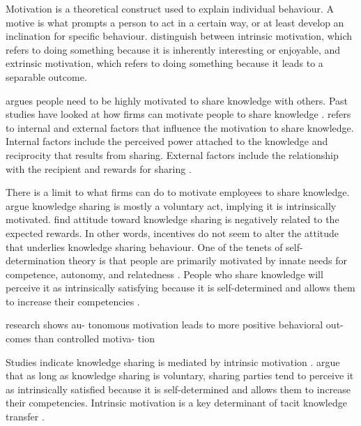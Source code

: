 Motivation is a theoretical construct used to explain individual behaviour. A motive is what prompts a person to act in a certain way, or at least develop an inclination for specific behaviour. \citet{deci1985general} distinguish between intrinsic motivation, which refers to doing something because it is inherently interesting or enjoyable, and extrinsic motivation, which refers to doing something because it leads to a separable outcome. 

\citet{davenport1997ten} argues people need to be highly motivated to share knowledge with others. Past studies have looked at how firms can motivate people to share knowledge \citep[e.g.][]{cabrera2002knowledge,ipe2003knowledge,cabrera2006determinants,wang2010knowledge,witherspoon2013antecedents,von2015s}. \citet{ipe2003knowledge} refers to internal and external factors that influence the motivation to share knowledge. Internal factors include the perceived power attached to the knowledge and reciprocity that results from sharing. External factors include the relationship with the recipient and rewards for sharing \citep{ipe2003knowledge}. \medskip

There is a limit to what firms can do to motivate employees to share knowledge. \citet{davenport1997information} argue knowledge sharing is mostly a voluntary act, implying it is intrinsically motivated. \citet{bock2001breaking} find attitude toward knowledge sharing is negatively related to the expected rewards. In other words, incentives do not seem to alter the attitude that underlies knowledge sharing behaviour. One of the tenets of self-determination theory is that people are primarily motivated by innate needs for competence, autonomy, and relatedness \citep{ryan2000intrinsic}. People who share knowledge will perceive it as intrinsically satisfying because it is self-determined and allows them to increase their competencies \citep{kaser2001knowledge,gagne2005self,lam2010knowledge}. \medskip 





research shows au- tonomous motivation leads to more positive behavioral out- comes than controlled motiva- tion

\medskip

Studies indicate knowledge sharing is mediated by intrinsic motivation \citep{bock2001breaking}. \citet{kaser2001knowledge} argue that as long as knowledge sharing is voluntary, sharing parties tend to perceive it as intrinsically satisfied because it is self-determined and allows them to increase their competencies. Intrinsic motivation is a key determinant of tacit knowledge transfer \citep{kaser2001knowledge,lam2010knowledge,dumbach2014establishing}. 

